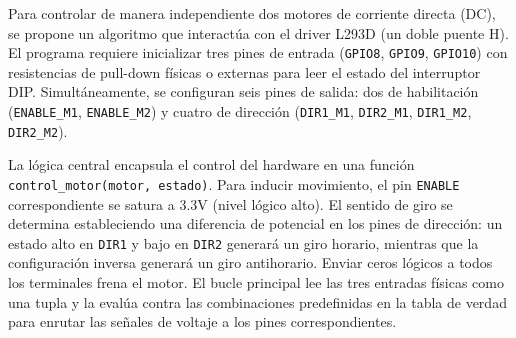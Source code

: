 \documentclass[letterpaper,12pt]{article}
\begin{document}
    Para controlar de manera independiente dos motores de corriente directa (DC), se propone un algoritmo que interactúa con el driver L293D (un doble puente H). El programa requiere inicializar tres pines de entrada (\texttt{GPIO8}, \texttt{GPIO9}, \texttt{GPIO10}) con resistencias de pull-down físicas o externas para leer el estado del interruptor DIP. Simultáneamente, se configuran seis pines de salida: dos de habilitación (\texttt{ENABLE\_M1}, \texttt{ENABLE\_M2}) y cuatro de dirección (\texttt{DIR1\_M1}, \texttt{DIR2\_M1}, \texttt{DIR1\_M2}, \texttt{DIR2\_M2}). 

    La lógica central encapsula el control del hardware en una función \texttt{control\_motor(motor, estado)}. Para inducir movimiento, el pin \texttt{ENABLE} correspondiente se satura a 3.3V (nivel lógico alto). El sentido de giro se determina estableciendo una diferencia de potencial en los pines de dirección: un estado alto en \texttt{DIR1} y bajo en \texttt{DIR2} generará un giro horario, mientras que la configuración inversa generará un giro antihorario. Enviar ceros lógicos a todos los terminales frena el motor. El bucle principal lee las tres entradas físicas como una tupla y la evalúa contra las combinaciones predefinidas en la tabla de verdad para enrutar las señales de voltaje a los pines correspondientes.
\end{document}
